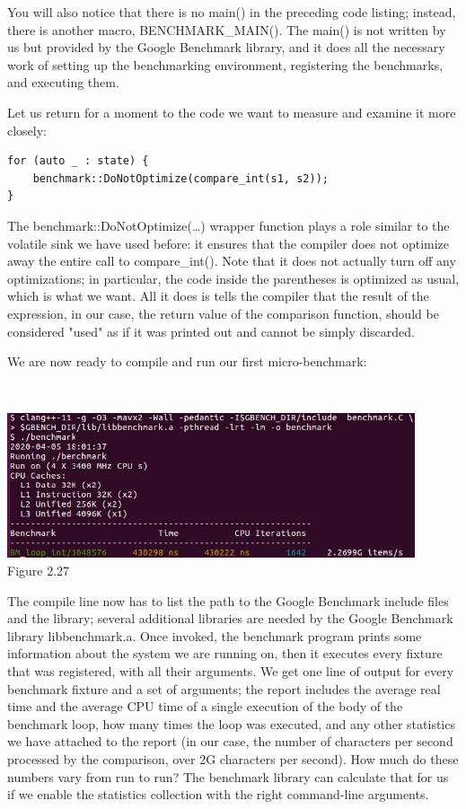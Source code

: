 You will also notice that there is no main() in the preceding code listing; instead, there is another macro, BENCHMARK\_MAIN(). The main() is not written by us but provided by the Google Benchmark library, and it does all the necessary work of setting up the benchmarking environment, registering the benchmarks, and executing them.

Let us return for a moment to the code we want to measure and examine it more closely:

\begin{lstlisting}[style=styleCXX]
for (auto _ : state) {
	benchmark::DoNotOptimize(compare_int(s1, s2));
}
\end{lstlisting}

The benchmark::DoNotOptimize(…) wrapper function plays a role similar to the volatile sink we have used before: it ensures that the compiler does not optimize away the entire call to compare\_int(). Note that it does not actually turn off any optimizations; in particular, the code inside the parentheses is optimized as usual, which is what we want. All it does is tells the compiler that the result of the expression, in our case, the return value of the comparison function, should be considered "used" as if it was printed out and cannot be simply discarded.

We are now ready to compile and run our first micro-benchmark:

\hspace*{\fill} \\ %
\begin{center}
\includegraphics[width=0.9\textwidth]{content/1/chapter2/images/27.jpg}\\
Figure 2.27
\end{center}

The compile line now has to list the path to the Google Benchmark include files and the library; several additional libraries are needed by the Google Benchmark library libbenchmark.a. Once invoked, the benchmark program prints some information about the system we are running on, then it executes every fixture that was registered, with all their arguments. We get one line of output for every benchmark fixture and a set of arguments; the report includes the average real time and the average CPU time of a single execution of the body of the benchmark loop, how many times the loop was executed, and any other statistics we have attached to the report (in our case, the number of characters per second processed by the comparison, over 2G characters per second). How much do these numbers vary from run to run? The benchmark library can calculate that for us if we enable the statistics collection with the right command-line arguments.

